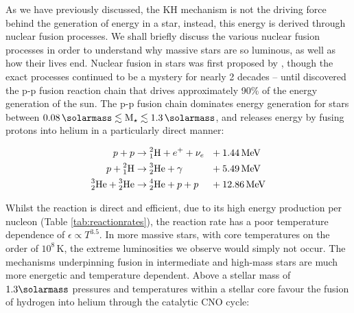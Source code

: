 \noindent
As we have previously discussed, the KH mechanism is not the driving force behind the generation of energy in a star, instead, this energy is derived through nuclear fusion processes.
We shall briefly discuss the various nuclear fusion processes in order to understand why massive stars are so luminous, as well as how their lives end.
Nuclear fusion in stars was first proposed by \textcite{eddingtonInternalConstitutionStars1920}, though the exact processes continued to be a mystery for nearly 2 decades -- until \textcite{betheEnergyProductionStars1939} discovered the p-p fusion reaction chain that drives approximately 90\% of the energy generation of the sun.
The p-p fusion chain dominates energy generation for stars between $0.08 \,\si{\solarmass} \lesssim \text{M}_\star \lesssim 1.3 \, \si{\solarmass}$, and releases energy by fusing protons into helium in a particularly direct manner: 

\begin{equation}
  \begin{alignedat}{3}
    p + p & \rightarrow \atom{H}{2}{1} + e^+ + \nu_e && ~~ + \SI{1.44}{\mega\electronvolt} \\
    p + \atom{H}{2}{1} & \rightarrow \atom{He}{3}{2} + \gamma && ~~ + \SI{5.49}{\mega\electronvolt} \\ 
    \atom{He}{3}{2} + \atom{He}{3}{2} & \rightarrow \atom{He}{4}{2} + p + p && ~~ + \SI{12.86}{\mega\electronvolt}
  \end{alignedat}
\end{equation}

\noindent
Whilst the reaction is direct and efficient, due to its high energy production per nucleon (Table \ref{tab:reactionrates}), the reaction rate has a poor temperature dependence of $\epsilon \propto T^{3.5}$.
In more massive stars, with core temperatures on the order of $10^8 \, \si{\kelvin}$, the extreme luminosities we observe would simply not occur.
The mechanisms underpinning fusion in intermediate and high-mass stars are much more energetic and temperature dependent.
Above a stellar mass of $1.3 \si{\solarmass}$ pressures and temperatures within a stellar core favour the fusion of hydrogen into helium through the catalytic CNO cycle:

